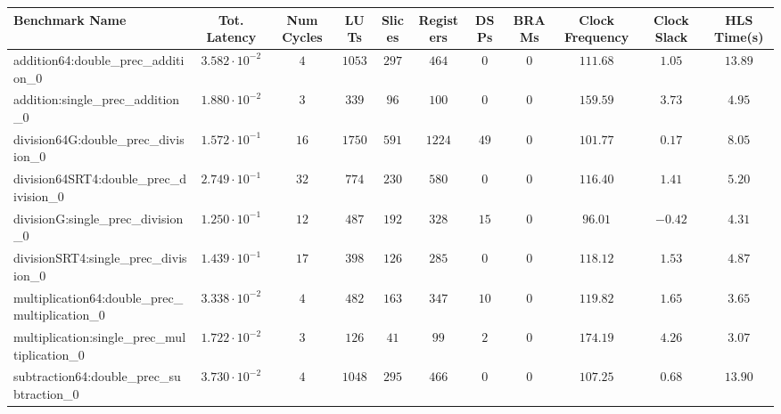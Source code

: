 \begin{tabular}{|l|c|c|c|c|c|c|c|c|c|c|}
\hline
Benchmark Name                                   & Tot. Latency            & Num Cycles & LUTs     & Slices   & Registers & DSPs   & BRAMs & Clock Frequency & Clock Slack & HLS Time(s) \\
\hline
addition64:double\_prec\_addition\_0             & $ 3.582 \cdot 10^{-2} $ & $ 4      $ & $ 1053 $ & $ 297  $ & $ 464   $ & $ 0  $ & $ 0 $ & $ 111.68      $ & $ 1.05    $ & $ 13.89   $ \\
addition:single\_prec\_addition\_0               & $ 1.880 \cdot 10^{-2} $ & $ 3      $ & $ 339  $ & $ 96   $ & $ 100   $ & $ 0  $ & $ 0 $ & $ 159.59      $ & $ 3.73    $ & $ 4.95    $ \\
division64G:double\_prec\_division\_0            & $ 1.572 \cdot 10^{-1} $ & $ 16     $ & $ 1750 $ & $ 591  $ & $ 1224  $ & $ 49 $ & $ 0 $ & $ 101.77      $ & $ 0.17    $ & $ 8.05    $ \\
division64SRT4:double\_prec\_division\_0         & $ 2.749 \cdot 10^{-1} $ & $ 32     $ & $ 774  $ & $ 230  $ & $ 580   $ & $ 0  $ & $ 0 $ & $ 116.40      $ & $ 1.41    $ & $ 5.20    $ \\
divisionG:single\_prec\_division\_0              & $ 1.250 \cdot 10^{-1} $ & $ 12     $ & $ 487  $ & $ 192  $ & $ 328   $ & $ 15 $ & $ 0 $ & $ 96.01       $ & $ -0.42   $ & $ 4.31    $ \\
divisionSRT4:single\_prec\_division\_0           & $ 1.439 \cdot 10^{-1} $ & $ 17     $ & $ 398  $ & $ 126  $ & $ 285   $ & $ 0  $ & $ 0 $ & $ 118.12      $ & $ 1.53    $ & $ 4.87    $ \\
multiplication64:double\_prec\_multiplication\_0 & $ 3.338 \cdot 10^{-2} $ & $ 4      $ & $ 482  $ & $ 163  $ & $ 347   $ & $ 10 $ & $ 0 $ & $ 119.82      $ & $ 1.65    $ & $ 3.65    $ \\
multiplication:single\_prec\_multiplication\_0   & $ 1.722 \cdot 10^{-2} $ & $ 3      $ & $ 126  $ & $ 41   $ & $ 99    $ & $ 2  $ & $ 0 $ & $ 174.19      $ & $ 4.26    $ & $ 3.07    $ \\
subtraction64:double\_prec\_subtraction\_0       & $ 3.730 \cdot 10^{-2} $ & $ 4      $ & $ 1048 $ & $ 295  $ & $ 466   $ & $ 0  $ & $ 0 $ & $ 107.25      $ & $ 0.68    $ & $ 13.90   $ \\

\end{tabular}
